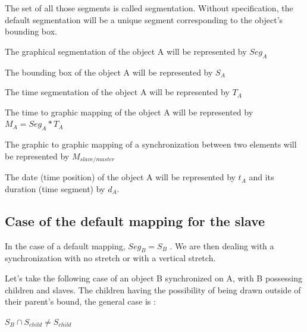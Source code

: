 \documentclass[a4paper]{article}
\begin{document}
The set of all those segments is called segmentation. Without specification, the default segmentation will be a unique segment corresponding to the object's bounding box.

\bigskip

The graphical segmentation of the object A will be represented by $Seg_A$


The bounding box of the object A will be represented by $S_A$

The time segmentation of the object A will be represented by $T_A$

The time to graphic mapping of the object A will be represented by $M_A = Seg_A * T_A$

The graphic to graphic mapping of a synchronization between two elements will be represented by $M_{slave/master}$

The date (time position) of the object A will be represented by $t_A$ and its duration (time segment) by $d_A$.


\subsection{Case of the default mapping for the slave}\label{subsec:defaultMap}

In the case of a default mapping, $Seg_B = S_B$ . We are then dealing with a synchronization with no stretch or with a vertical stretch. 

Let's take the following case of an object B synchronized on A, with B possessing children and slaves. 
The children having the possibility of being drawn outside of their parent's bound, the general case is : 
\begin{center} $S_B \cap S_{child} \neq S_{child}$ \end{center}

\bigskip
\end{document}
